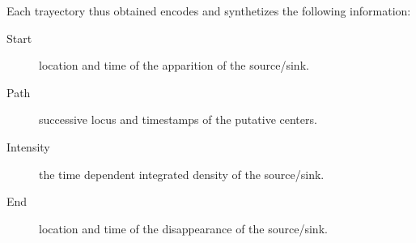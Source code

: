 \documentclass{article}
\begin{document}
Each trayectory thus obtained encodes and synthetizes the following information:
\begin{description}
\item[Start] location and time of the apparition of the source/sink.
\item[Path] successive locus and timestamps of the putative centers.
\item[Intensity] the time dependent integrated density of the source/sink.  
\item[End] location and time of the disappearance of the source/sink.
\end{description}
\end{document}
